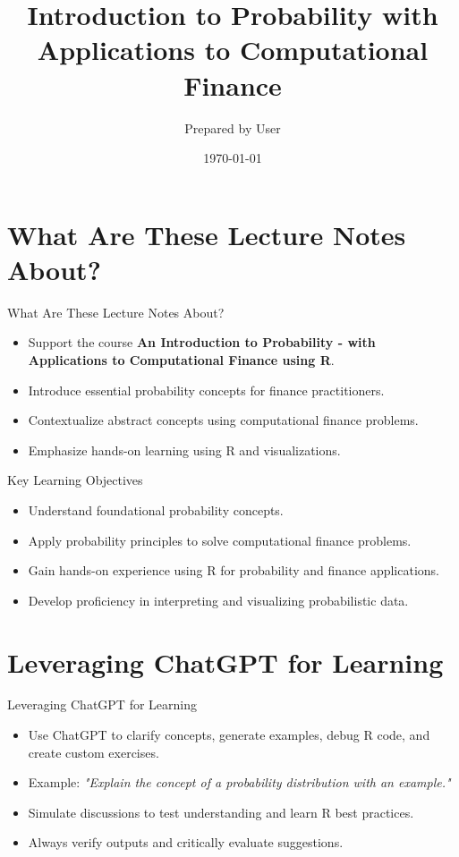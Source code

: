 \documentclass{beamer}
\title{Introduction to Probability with Applications to Computational Finance}
\author{Prepared by User}
\date{\today}
\begin{document}
\maketitle

\section{What Are These Lecture Notes About?}
\begin{frame}{What Are These Lecture Notes About?}
\begin{itemize}
    \item Support the course \textbf{An Introduction to Probability - with Applications to Computational Finance using R}.
    \item Introduce essential probability concepts for finance practitioners.
    \item Contextualize abstract concepts using computational finance problems.
    \item Emphasize hands-on learning using R and visualizations.
\end{itemize}
\end{frame}

\begin{frame}{Key Learning Objectives}
\begin{itemize}
    \item Understand foundational probability concepts.
    \item Apply probability principles to solve computational finance problems.
    \item Gain hands-on experience using R for probability and finance applications.
    \item Develop proficiency in interpreting and visualizing probabilistic data.
\end{itemize}
\end{frame}

\section{Leveraging ChatGPT for Learning}
\begin{frame}{Leveraging ChatGPT for Learning}
\begin{itemize}
    \item Use ChatGPT to clarify concepts, generate examples, debug R code, and create custom exercises.
    \item Example: \textit{"Explain the concept of a probability distribution with an example."}
    \item Simulate discussions to test understanding and learn R best practices.
    \item Always verify outputs and critically evaluate suggestions.
\end{itemize}
\end{frame}
\end{document}
